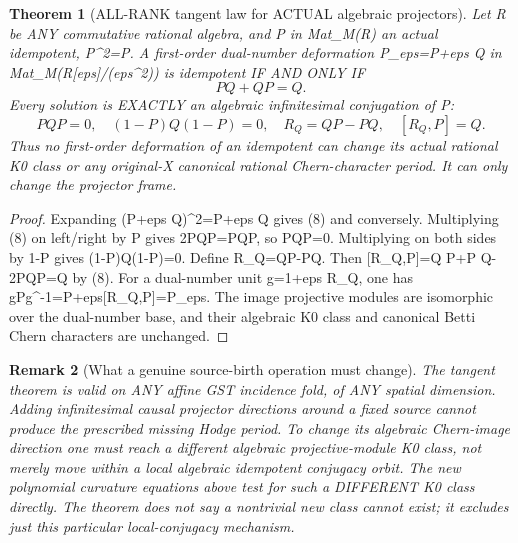 \documentclass[11pt]{article}
\newtheorem{theorem}{Theorem}[section]
\newtheorem{remark}[theorem]{Remark}
\begin{document}
\begin{theorem}[ALL-RANK tangent law for ACTUAL algebraic projectors]
Let R be ANY commutative rational algebra, and
P in Mat_M(R) an actual idempotent, P^2=P.
A first-order dual-number deformation
P_eps=P+eps Q in Mat_M(R[eps]/(eps^2))
is idempotent IF AND ONLY IF
\[
 \boxed{PQ+QP=Q.}                                      \tag{8}
\]
Every solution is EXACTLY an algebraic
infinitesimal conjugation of P:
\[
 \boxed{
 PQP=0,\quad (1-P)Q(1-P)=0,\quad
 R_Q=QP-PQ,\quad [R_Q,P]=Q.
 }                                                       \tag{9}
\]
Thus no first-order deformation of an idempotent
can change its actual rational K0 class or any
original-X canonical rational Chern-character period.
It can only change the projector frame.
\end{theorem}
\begin{proof}
Expanding (P+eps Q)^2=P+eps Q
gives (8) and conversely.
Multiplying (8) on left/right by P gives
2PQP=PQP, so PQP=0. Multiplying
on both sides by 1-P gives
(1-P)Q(1-P)=0. Define R_Q=QP-PQ.
Then
[R_Q,P]=Q P+P Q-2PQP=Q by (8).
For a dual-number unit g=1+eps R_Q,
one has gPg^{-1}=P+eps[R_Q,P]=P_eps.
The image projective modules are isomorphic
over the dual-number base, and their
algebraic K0 class and canonical Betti
Chern characters are unchanged.
\end{proof}

\begin{remark}[What a genuine source-birth operation must change]
The tangent theorem is valid on ANY affine GST
incidence fold, of ANY spatial dimension.
Adding infinitesimal causal projector directions
around a fixed source cannot produce the prescribed
missing Hodge period. To change its algebraic
Chern-image direction one must reach a different
algebraic projective-module K0 class, not merely
move within a local algebraic idempotent conjugacy
orbit. The new polynomial curvature equations
above test for such a DIFFERENT K0 class directly.
The theorem does not say a nontrivial new class
cannot exist; it excludes just this particular
local-conjugacy mechanism.
\end{remark}
\end{document}

